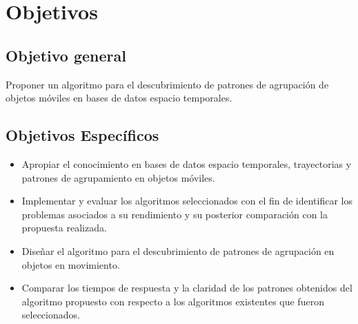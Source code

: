 
\chapter{Objetivos}

\section{Objetivo general}

Proponer un algoritmo para el descubrimiento de patrones de agrupación de objetos móviles en bases de datos espacio temporales.

\section{Objetivos Específicos}

\begin{itemize}
 \item Apropiar el conocimiento en bases de datos espacio temporales, trayectorias y patrones de agrupamiento en objetos móviles.
 \item Implementar y evaluar los algoritmos seleccionados con el fin de identificar los problemas asociados a su rendimiento y su posterior comparación con la propuesta realizada.
 \item Diseñar el algoritmo para el descubrimiento de patrones de agrupación en objetos en movimiento.
 \item  Comparar los tiempos de respuesta y la claridad de los patrones obtenidos del algoritmo propuesto con respecto a los algoritmos existentes que fueron seleccionados.
\end{itemize}

